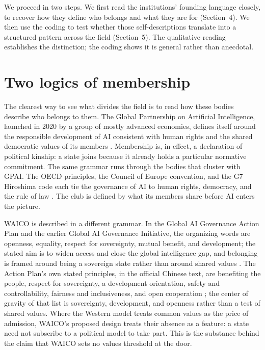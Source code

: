 \documentclass[11pt]{article}
\begin{document}
We proceed in two steps. We first read the institutions' founding language closely, to recover how they define who belongs and what they are for (Section~4). We then use the coding to test whether those self-descriptions translate into a structured pattern across the field (Section~5). The qualitative reading establishes the distinction; the coding shows it is general rather than anecdotal.

\section{Two logics of membership}
The clearest way to see what divides the field is to read how these bodies describe who belongs to them. The Global Partnership on Artificial Intelligence, launched in 2020 by a group of mostly advanced economies, defines itself around the responsible development of AI consistent with human rights and the shared democratic values of its members \citep{gpai2020founding}. Membership is, in effect, a declaration of political kinship: a state joins because it already holds a particular normative commitment. The same grammar runs through the bodies that cluster with GPAI. The OECD principles, the Council of Europe convention, and the G7 Hiroshima code each tie the governance of AI to human rights, democracy, and the rule of law \citep{oecd2019principles, coe2024convention, g72023hiroshima}. The club is defined by what its members share before AI enters the picture.

WAICO is described in a different grammar. In the Global AI Governance Action Plan and the earlier Global AI Governance Initiative, the organizing words are openness, equality, respect for sovereignty, mutual benefit, and development; the stated aim is to widen access and close the global intelligence gap, and belonging is framed around being a sovereign state rather than around shared values \citep{mfa2025actionplan, mfa2023initiative, govcn2025waic}. The Action Plan's own stated principles, in the official Chinese text, are benefiting the people, respect for sovereignty, a development orientation, safety and controllability, fairness and inclusiveness, and open cooperation \citep{mfa2025actionplanzh}; the center of gravity of that list is sovereignty, development, and openness rather than a test of shared values. Where the Western model treats common values as the price of admission, WAICO's proposed design treats their absence as a feature: a state need not subscribe to a political model to take part. This is the substance behind the claim that WAICO sets no values threshold at the door.
\end{document}
